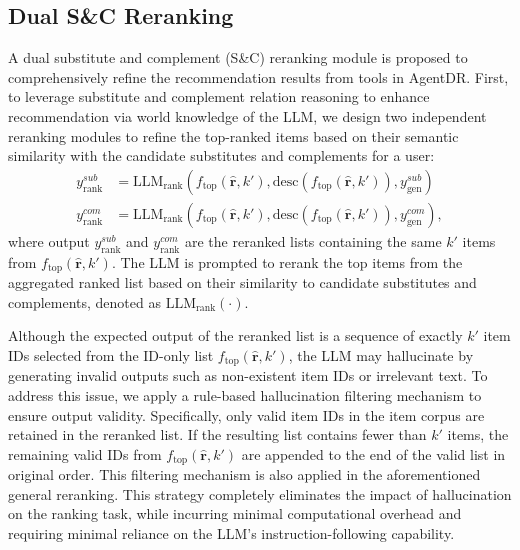 \subsection{Dual S\&C Reranking}\label{sec:dualrerank}
A dual substitute and complement (S\&C) reranking module is proposed to comprehensively refine the recommendation results from tools in AgentDR. First, to leverage substitute and complement relation reasoning to enhance recommendation via world knowledge of the LLM, we design two independent reranking modules to refine the top-ranked items based on their semantic similarity with the candidate substitutes and complements for a user:
\begin{align}
    y_{\text{rank}}^{sub} &= \text{LLM}_{\text{rank}}(f_\text{top}(\hat{\mathbf{r}},k'), \text{desc}(f_\text{top}(\hat{\mathbf{r}},k')),y_{\text{gen}}^{sub}) \label{eq_agentdr:rerank_sub}\\
    y_{\text{rank}}^{com} &= \text{LLM}_{\text{rank}}(f_\text{top}(\hat{\mathbf{r}},k'), \text{desc}(f_\text{top}(\hat{\mathbf{r}},k')),y_{\text{gen}}^{com}), \label{eq_agentdr:rerank_com}
\end{align}
where output $y_{\text{rank}}^{sub}$ and $y_{\text{rank}}^{com}$ are the reranked lists containing the same $k'$ items from $f_\text{top}(\hat{\mathbf{r}},k')$. The LLM is prompted to rerank the top items from the aggregated ranked list based on their similarity to candidate substitutes and complements, denoted as $\text{LLM}_{\text{rank}}(\cdot)$. 

Although the expected output of the reranked list is a sequence of exactly $k'$ item IDs selected from the ID-only list $f_\text{top}(\hat{\mathbf{r}},k')$, the LLM may hallucinate by generating invalid outputs such as non-existent item IDs or irrelevant text. To address this issue, we apply a rule-based hallucination filtering mechanism to ensure output validity. Specifically, only valid item IDs in the item corpus are retained in the reranked list. If the resulting list contains fewer than $k'$ items, the remaining valid IDs from $f_\text{top}(\hat{\mathbf{r}},k')$ are appended to the end of the valid list in original order. This filtering mechanism is also applied in the aforementioned general reranking.
This strategy completely eliminates the impact of hallucination on the ranking task, while incurring minimal computational overhead and requiring minimal reliance on the LLM’s instruction-following capability.

